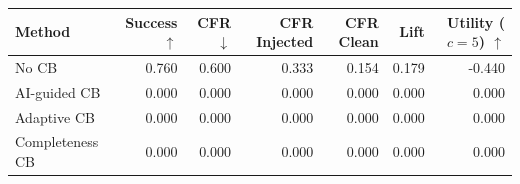 \begin{tabular}{lrrrrrr}
\toprule
Method & Success $\uparrow$ & CFR $\downarrow$ & CFR Injected & CFR Clean & Lift & Utility ($c=5$) $\uparrow$ \\
\midrule
No CB & 0.760 & 0.600 & 0.333 & 0.154 & 0.179 & -0.440 \\
AI-guided CB & 0.000 & 0.000 & 0.000 & 0.000 & 0.000 & 0.000 \\
Adaptive CB & 0.000 & 0.000 & 0.000 & 0.000 & 0.000 & 0.000 \\
Completeness CB & 0.000 & 0.000 & 0.000 & 0.000 & 0.000 & 0.000 \\
\bottomrule
\end{tabular}
